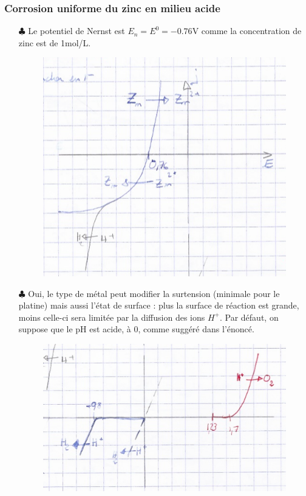 \documentclass{report}
\begin{document}
\subsubsection*{Corrosion uniforme du zinc en milieu acide}

\begin{itemize}
	
	\item[$\clubsuit$] Le potentiel de Nernst est $E_n=E^0=-0.76$V comme la concentration de zinc est de 1mol/L.
	
	\begin{figure}[h!]
	\centering
			\includegraphics[scale=0.25]{pot_zn.png}
	\end{figure}	
	
	\item[$\clubsuit$] Oui, le type de métal peut modifier la surtension (minimale pour le platine) mais aussi l'état de surface : plus la surface de réaction est grande, moins celle-ci sera limitée par la diffusion des ions $H^+$. Par défaut, on suppose que le pH est acide, à 0, comme suggéré dans l'énoncé. 
	
	\begin{figure}[h!]
	\centering
			\includegraphics[scale=0.25]{pot_h.png}
	\end{figure}	
	

\end{itemize}
\end{document}
